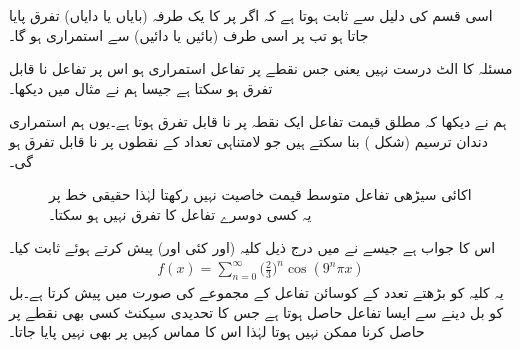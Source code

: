 اسی قسم کی دلیل سے ثابت ہوتا ہے کہ اگر  پر  کا یک طرفہ (بایاں یا دایاں) تفرق پایا جاتا ہو تب  پر  اسی طرف (بائیں یا دائیں) سے استمراری ہو گا۔

\quad مسئلہ  کا الٹ درست نہیں یعنی جس نقطے پر تفاعل استمراری ہو اس پر تفاعل نا قابل تفرق ہو سکتا ہے جیسا ہم نے مثال  میں دیکھا۔

 ہم نے دیکھا کہ مطلق قیمت تفاعل  ایک نقطہ پر نا قابل تفرق ہوتا ہے۔یوں ہم استمراری دندان ترسیم (شکل ) بنا سکتے ہیں جو لامتناہی تعداد کے نقطوں پر نا قابل تفرق ہو گی۔
\begin{figure}
\centering
\begin{minipage}{0.45\textwidth}
\centering
{}
\caption{دندان ترسیم استمراری لیکن لامتناہی نقطوں پر نا قابل تفرق ہے۔}
\label{شکل_تفرق_دندان_ترسیم}
\end{minipage}\hfill
\begin{minipage}{0.45\textwidth}
\centering
{}
\caption{اکائی سیڑھی تفاعل متوسط قیمت خاصیت نہیں رکھتا   لہٰذا حقیقی خط پر یہ کسی دوسرے تفاعل کا تفرق نہیں ہو سکتا۔}
\label{شکل_تفرق_اکائی_سیڑھی_تفاعل}
\end{minipage}
\end{figure}

 اس کا جواب ہے  جیسے   نے  میں درج ذیل کلیہ (اور کئی اور) پیش کرتے ہوئے ثابت کیا۔
\begin{align*}
f(x)=\sum_{n=0}^{\infty}\big(\frac{2}{3}\big)^n\cos (9^n\pi x)
\end{align*}
یہ کلیہ  کو  بڑھتے تعدد کے کوسائن تفاعل کے مجموعے کی صورت میں پیش کرتا ہے۔بل کو بل دینے سے ایسا تفاعل حاصل ہوتا ہے جس کا تحدیدی سیکنٹ کسی بھی نقطے پر حاصل کرنا ممکن نہیں ہوتا   لہٰذا اس کا مماس کہیں پر بھی نہیں پایا جاتا۔ 

